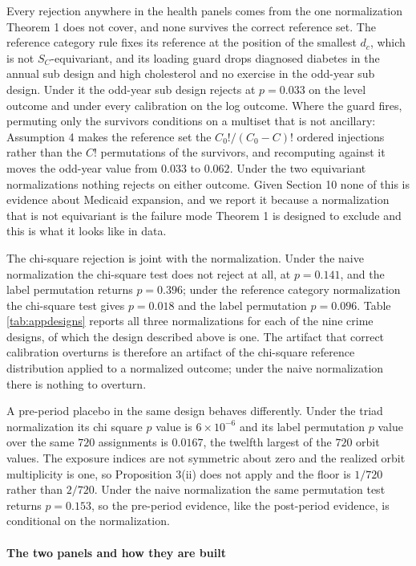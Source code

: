 \documentclass[12pt]{article}
\theoremstyle{definition}
\numberwithin{equation}{section}
\begin{document}
Every rejection anywhere in the health panels comes from the one
normalization Theorem 1 does not cover, and none survives the
correct reference set. The reference category rule fixes its reference at the
position of the smallest $d_c$, which is not $S_C$-equivariant, and its loading
guard drops diagnosed diabetes in the annual sub design and high cholesterol
and no exercise in the odd-year sub design. Under it the odd-year sub design
rejects at $p = 0.033$ on the level outcome and under every calibration on the
log outcome. Where the guard fires, permuting only the survivors conditions on a
multiset that is not ancillary: Assumption 4 makes the reference set
the $C_0!/(C_0-C)!$ ordered injections rather than the $C!$ permutations of the
survivors, and recomputing against it moves the odd-year value from $0.033$ to
$0.062$. Under the two equivariant normalizations nothing rejects on either
outcome. Given Section 10 none of this is evidence about
Medicaid expansion, and we report it because a normalization that is not
equivariant is the failure mode Theorem 1 is designed to exclude
and this is what it looks like in data.

The chi-square rejection is joint with the normalization. Under the naive
normalization the chi-square test does not reject at all, at $p = 0.141$, and
the label permutation returns $p = 0.396$; under the reference category
normalization the chi-square test gives $p = 0.018$ and the label permutation
$p = 0.096$. Table \ref{tab:appdesigns} reports all three normalizations for
each of the nine crime designs, of which the design described above is one. The
artifact that correct calibration overturns is therefore an artifact of the
chi-square reference distribution applied to a normalized outcome; under the
naive normalization there is nothing to overturn.

A pre-period placebo in the same design behaves differently. Under the triad
normalization its chi square $p$ value is $6 \times 10^{-6}$ and its
label permutation $p$ value over the same $720$ assignments is $0.0167$, the
twelfth largest of the $720$ orbit values. The exposure indices are not
symmetric about zero and the realized orbit multiplicity is one, so
Proposition 3(ii) does not apply and the floor is $1/720$
rather than $2/720$. Under the naive normalization the same permutation test
returns $p = 0.153$, so the pre-period evidence, like the post-period evidence,
is conditional on the normalization.

\paragraph{The two panels and how they are built}
\end{document}

